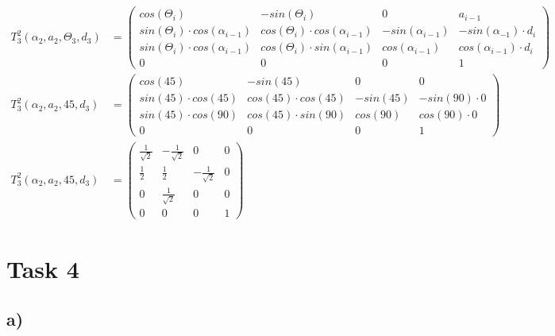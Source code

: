 \begin{align*}
T_3^2(\alpha_2,a_2,\Theta_3,d_3) &= \left( \begin{matrix} cos(\Theta_{i}) & -sin(\Theta_i) & 0 & a_{i-1} \\ sin(\Theta_i) \cdot cos(\alpha_{i-1}) & cos(\Theta_i) \cdot cos(\alpha_{i-1}) & -sin(\alpha_{i-1}) & -sin(\alpha_{-1}) \cdot d_i \\ sin(\Theta_i) \cdot cos(\alpha_{i-1}) & cos(\Theta_i) \cdot sin(\alpha_{i-1}) & cos(\alpha_{i-1}) & cos(\alpha_{i-1}) \cdot d_i \\  0 & 0 & 0 & 1\end{matrix} \right) \\
T_3^2(\alpha_2,a_2,45,d_3) &= \left( \begin{matrix} cos(45) & -sin(45) & 0 & 0 \\ sin(45) \cdot cos(45) & cos(45) \cdot cos(45) & -sin(45) & -sin(90) \cdot 0 \\ sin(45) \cdot cos(90) & cos(45) \cdot sin(90) & cos(90) & cos(90) \cdot 0 \\  0 & 0 & 0 & 1\end{matrix} \right) \\
T_3^2(\alpha_2,a_2,45,d_3) &= \left( \begin{matrix} \frac{1}{\sqrt{2}} & -\frac{1}{\sqrt{2}} & 0 & 0 \\ \frac{1}{2} & \frac{1}{2} & -\frac{1}{\sqrt{2}} & 0 \\ 0 & \frac{1}{\sqrt{2}} & 0 & 0 \\  0 & 0 & 0 & 1\end{matrix} \right)
\end{align*}

\section{Task 4}\label{ass5_t4}

\subsection{a)}\label{ass5_t4a}

